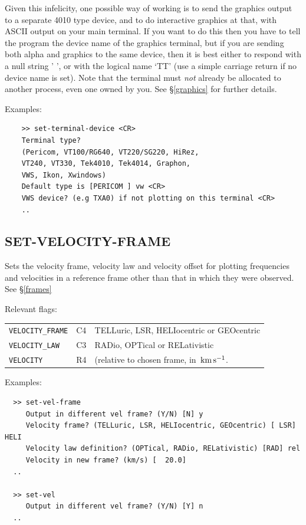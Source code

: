 \documentclass[11pt,twoside]{report}
\begin{document}
Given this infelicity, one possible way of working is to send the graphics
output to a separate 4010 type device, and to do interactive graphics
at that, with ASCII output on your main terminal. If you want to do this
then you have to tell the program the device name of the graphics terminal,
but if you are sending both alpha and graphics to the same device, then
it is best either to respond with a null string ' ', or with the logical name
`TT' (use a simple carriage return if no device name is set). Note that the
terminal must {\em not} already be allocated to another process, even one
owned by you. See \S\ref{graphics} for further details.

Examples:
\begin{verbatim}
    >> set-terminal-device <CR>
    Terminal type?
    (Pericom, VT100/RG640, VT220/SG220, HiRez,
    VT240, VT330, Tek4010, Tek4014, Graphon,
    VWS, Ikon, Xwindows)
    Default type is [PERICOM ] vw <CR>
    VWS device? (e.g TXA0) if not plotting on this terminal <CR>
    ..
\end{verbatim}

\subsection{SET-VELOCITY-FRAME} 

Sets the velocity frame, velocity law and velocity offset for plotting 
frequencies and velocities in a reference frame other than that in which
they were observed. See \S\ref{frames}

Relevant flags:\\
\begin{tabular}{lll}
   \verb+VELOCITY_FRAME+ & C4 & TELLuric, LSR, HELIocentric or GEOcentric\\
   \verb+VELOCITY_LAW+ & C3 & RADio, OPTical or RELativistic\\
   \verb+VELOCITY+ & R4 & (relative to chosen frame, in ${\rm\,km\,s^{-1}}$.
\end{tabular}

Examples:
\begin{verbatim}
  >> set-vel-frame
     Output in different vel frame? (Y/N) [N] y
     Velocity frame? (TELLuric, LSR, HELIocentric, GEOcentric) [ LSR] HELI
     Velocity law definition? (OPTical, RADio, RELativistic) [RAD] rel
     Velocity in new frame? (km/s) [  20.0] 
  ..

  >> set-vel
     Output in different vel frame? (Y/N) [Y] n
  ..
\end{verbatim}
\end{document}
